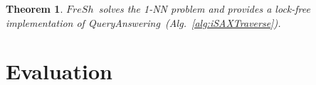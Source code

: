 \documentclass[a4paper,11pt,twoside,openany]{book}
\newtheorem{theorem}{Theorem}[section]
\newcommand{\QueryAnswering}{\mbox{\sc QueryAnswering}}
\newcommand{\Fresh}{\mbox{$\mathit{FreSh}$}}
\begin{document}
    \begin{theorem}
    \label{thm:qa}
    \Fresh\ solves the 1-NN problem and provides a lock-free implementation of \QueryAnswering\
    (Alg.~\ref{alg:iSAXTraverse}). 
    \end{theorem}
    
    


\chapter{Evaluation}
\label{chapter:Evaluation}






\cleardoublepage
{}

\end{document}
